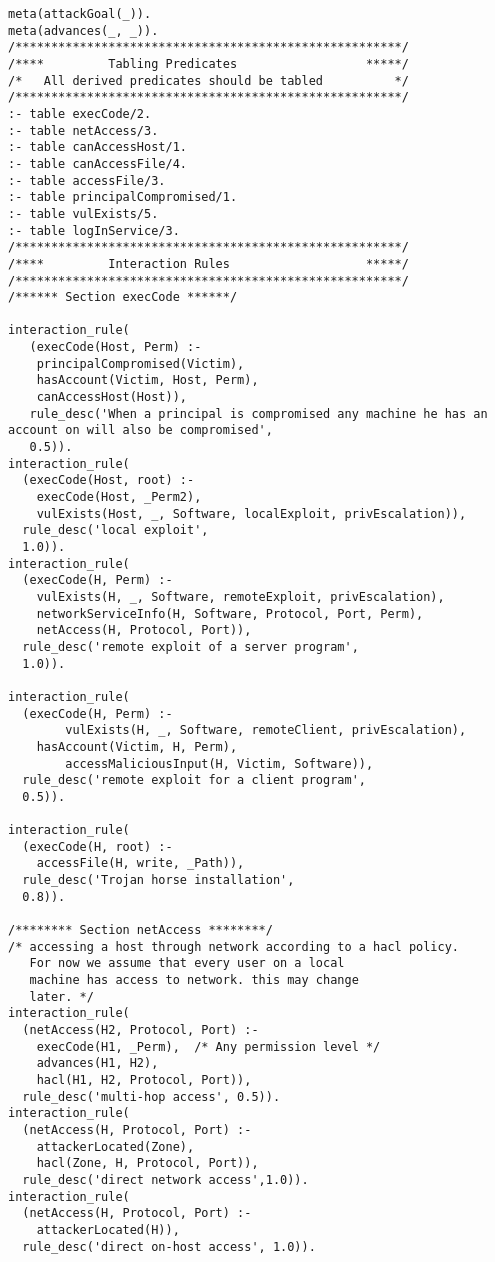 \begin{lstlisting}[style=datalog, label={lst:mulval_primitives}, caption={Mulval Primitive and Derived Facts}]
meta(attackGoal(_)).
meta(advances(_, _)).
/******************************************************/
/****         Tabling Predicates                  *****/
/*   All derived predicates should be tabled          */
/******************************************************/
:- table execCode/2.
:- table netAccess/3.
:- table canAccessHost/1.
:- table canAccessFile/4.
:- table accessFile/3.
:- table principalCompromised/1.
:- table vulExists/5.
:- table logInService/3.
/******************************************************/
/****         Interaction Rules                   *****/
/******************************************************/
/****** Section execCode ******/

interaction_rule(
   (execCode(Host, Perm) :-
	principalCompromised(Victim),
	hasAccount(Victim, Host, Perm),
	canAccessHost(Host)),
   rule_desc('When a principal is compromised any machine he has an account on will also be compromised',
   0.5)).
interaction_rule(
  (execCode(Host, root) :-
	execCode(Host, _Perm2),
	vulExists(Host, _, Software, localExploit, privEscalation)),
  rule_desc('local exploit',
  1.0)).
interaction_rule(
  (execCode(H, Perm) :-
	vulExists(H, _, Software, remoteExploit, privEscalation),
	networkServiceInfo(H, Software, Protocol, Port, Perm),
	netAccess(H, Protocol, Port)),
  rule_desc('remote exploit of a server program',
  1.0)).

interaction_rule(
  (execCode(H, Perm) :-
        vulExists(H, _, Software, remoteClient, privEscalation),
	hasAccount(Victim, H, Perm),
        accessMaliciousInput(H, Victim, Software)),
  rule_desc('remote exploit for a client program',
  0.5)).

interaction_rule(
  (execCode(H, root) :-
	accessFile(H, write, _Path)),
  rule_desc('Trojan horse installation',
  0.8)).

/******** Section netAccess ********/
/* accessing a host through network according to a hacl policy.
   For now we assume that every user on a local
   machine has access to network. this may change
   later. */
interaction_rule(
  (netAccess(H2, Protocol, Port) :-
	execCode(H1, _Perm),  /* Any permission level */
	advances(H1, H2),
    hacl(H1, H2, Protocol, Port)),
  rule_desc('multi-hop access', 0.5)).
interaction_rule(
  (netAccess(H, Protocol, Port) :-
	attackerLocated(Zone),
	hacl(Zone, H, Protocol, Port)),
  rule_desc('direct network access',1.0)).
interaction_rule(
  (netAccess(H, Protocol, Port) :-
	attackerLocated(H)),
  rule_desc('direct on-host access', 1.0)).
  

\end{lstlisting}
